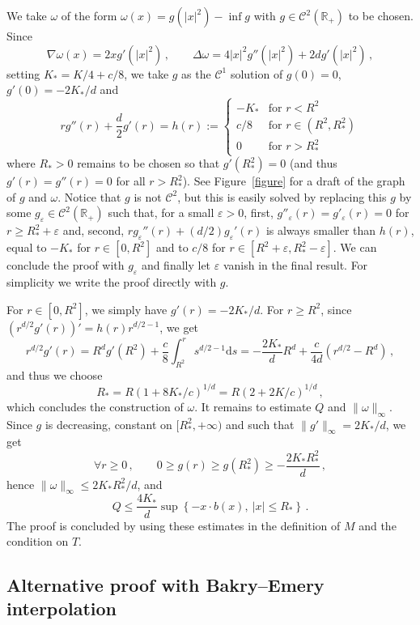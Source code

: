 \documentclass[AHL,Unicode,longabstracts,published]{cedram}
\newcommand{\R}{\mathbb R}
\newcommand{\clC}{\mathcal C}
\newcommand{\dd}{\mathrm{d}}
\newcommand{\na}{\nabla}
\newcommand{\1}{\mathbbm{1}}
\newcommand{\nv}[1]{#1}
\let\oldforall\forall
\renewcommand*{\forall}{\mathrel{\oldforall}}
\newcommand{\R}{\mathbb R}
\begin{document}
We take $\nv{\omega}$ of the form $\nv{\omega}(x) = g(|x|^2)-\inf g$ with $g\in\clC^2(\R_+)$ to be chosen. Since
\[
\na\nv{\omega}(x) = 2xg'(|x|^2) \,,\qquad \Delta \nv{\omega} = 4|x|^2 g''(|x|^2) + 2dg'(|x|^2)\,,
\]
setting $K_* = K/4+c/8$, we take $g$ as the $\clC^1$ solution of $g(0)=0$, $g'(0)=-2K_*/d$ and
\[
r g''(r) + \frac{d}2 g'(r) = h(r):= \left\{
\begin{array}{ll}
-K_* & \text{for }r<R^2\\
c/8 & \text{for }r\in\left(R^2,R_*^2\right)\\
0 & \text{for }r>R_*^2
\end{array}\right.
\]
where $R_*>0$ remains to be chosen so that $g'(R_*^2)=0$ (and thus $g'(r)=g''(r)=0$ for all $r> R_*^2$). See Figure~\ref{figure} for a draft of the graph of $g$ and $\omega$. Notice that $g$ is not $\clC^2$, but this is easily solved by replacing this $g$ by some $g_\varepsilon \in\clC^2(\R_+)$ such that, for a small $\varepsilon>0$, first, $g''_\varepsilon(r)=g'_\varepsilon(r)=0$ for $r\geqslant R_*^2 + \varepsilon$ and, second, $r g_\varepsilon''(r) + \nv{(d/2)} g_\varepsilon'(r)$ is always smaller than $h(r)$, equal to $ -K_*$ for $r\in[0,R^2]$ and to $c/8$ for $r\in[R^2+\varepsilon,R_*^2-\varepsilon]$. We can conclude the proof with $g_\varepsilon$ and finally let $\varepsilon$ vanish in the final result. For simplicity we write the proof directly with $g$.

For $r\in[0,R^2]$, we simply have $g'(r) = -2K_*/d$. For $r\geqslant R^2$, since $(r^{d/2} g'(r))' = h(r) r^{d/2-1}$, we get
\[
r^{d/2} g'(r) = R^{d} g'(R^2) + \frac c8\int_{R^2}^r s^{d/2-1}\dd s = -\frac{2K_*}{d}R^{d} + \frac{c}{4d}\left( r^{d/2} - R^{d}\right) \,,
\]
and thus we choose
\[
R_* = R \left( 1+ 8K_*/c\right)^{1/d} = R\left( 2+2K/c\right)^{1/d}\,,
\]
which concludes the construction of $\nv{\omega}$. It remains to estimate $Q$ and $\|\nv{\omega}\|_\infty$. Since $g$ is decreasing, constant on $[R_*^2,+\infty)$ and such that $\|g'\|_\infty =2K_*/d$, we get
\[
\forall r\geqslant0\,,\qquad 0 \geqslant g(r) \geqslant g(R_*^2) \geqslant -\frac{2K_*R_*^2}{d}\,,
\]
hence $\|\nv{\omega}\|_\infty \leqslant 2K_* R_*^2/d$, and
\[
Q \leqslant \frac{4K_*}{d} \sup\left\{-x\cdot b(x),\ |x|\leqslant R_*\right\}\,.
\]
The proof is concluded by using these estimates in the definition of $M$ and the condition on $T$.

\subsection{Alternative proof with Bakry--Emery interpolation}\label{Sec:preuveAlternative}
\end{document}
